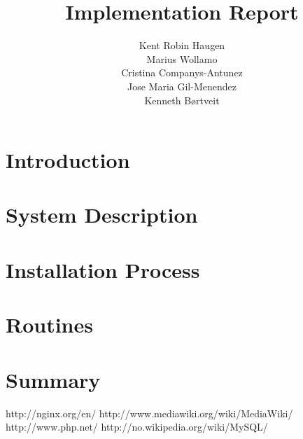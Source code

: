 \documentclass[a4, paper]{article}
\title{Implementation Report}
\author{Kent Robin Haugen \\ Marius Wollamo \\ Cristina Companys-Antunez \\ Jose Maria Gil-Menendez \\ Kenneth Børtveit}
\begin{document}
\maketitle
\tableofcontents
\section{Introduction}

\section{System Description}

\section{Installation Process}

\section{Routines}

\section{Summary}

\begin{thebibliography}{9}
http://nginx.org/en/
http://www.mediawiki.org/wiki/MediaWiki/
http://www.php.net/
http://no.wikipedia.org/wiki/MySQL/
\end{thebibliography}
\end{document}
